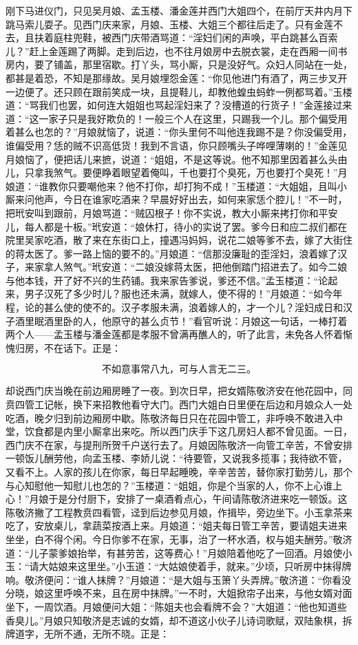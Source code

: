 刚下马进仪门，只见吴月娘、孟玉楼、潘金莲并西门大姐四个，在前厅天井内月下跳马索儿耍子。见西门庆来家，月娘、玉楼、大姐三个都往后走了。只有金莲不去，且扶着庭柱兜鞋，被西门庆带酒骂道：“淫妇们闲的声唤，平白跳甚么百索儿？”赶上金莲踢了两脚。走到后边，也不往月娘房中去脱衣裳，走在西厢一间书房内，要了铺盖，那里宿歇。打丫头，骂小厮，只是没好气。众妇人同站在一处，都甚是着恐，不知是那缘故。吴月娘埋怨金莲：“你见他进门有酒了，两三步叉开一边便了。还只顾在跟前笑成一块，且提鞋儿，却教他蝗虫蚂蚱一例都骂着。”玉楼道：“骂我们也罢，如何连大姐姐也骂起淫妇来了？没槽道的行货子！”金莲接过来道：“这一家子只是我好欺负的！一般三个人在这里，只踢我一个儿。那个偏受用着甚么也怎的？”月娘就恼了，说道：“你头里何不叫他连我踢不是？你没偏受用，谁偏受用？恁的贼不识高低货！我到不言语，你只顾嘴头子哗哩薄喇的！”金莲见月娘恼了，便把话儿来摭，说道：“姐姐，不是这等说。他不知那里因着甚么头由儿，只拿我煞气。要便睁着眼望着俺叫，千也要打个臭死，万也要打个臭死！”月娘道：“谁教你只要嘲他来？他不打你，却打狗不成！”玉楼道：“大姐姐，且叫小厮来问他声，今日在谁家吃酒来？早晨好好出去，如何来家恁个腔儿！”不一时，把玳安叫到跟前，月娘骂道：“贼囚根子！你不实说，教大小厮来拷打你和平安儿，每人都是十板。”玳安道：“娘休打，待小的实说了罢。爹今日和应二叔们都在院里吴家吃酒，散了来在东街口上，撞遇冯妈妈，说花二娘等爹不去，嫁了大街住的蒋太医了。爹一路上恼的要不的。”月娘道：“信那没廉耻的歪淫妇，浪着嫁了汉子，来家拿人煞气。”玳安道：“二娘没嫁蒋太医，把他倒踏门招进去了。如今二娘与他本钱，开了好不兴的生药铺。我来家告爹说，爹还不信。”孟玉楼道：“论起来，男子汉死了多少时儿？服也还未满，就嫁人，使不得的！”月娘道：“如今年程，论的甚么使的使不的。汉子孝服未满，浪着嫁人的，才一个儿？淫妇成日和汉子酒里眠酒里卧的人，他原守的甚么贞节！”看官听说：月娘这一句话，一棒打着两个人——孟玉楼与潘金莲都是孝服不曾满再醮人的，听了此言，未免各人怀着惭愧归房，不在话下。正是：

\[
不如意事常八九，可与人言无二三。
\]

却说西门庆当晚在前边厢房睡了一夜。到次日早，把女婿陈敬济安在他花园中，同贲四管工记帐，换下来招教他看守大门。西门大姐白日里便在后边和月娘众人一处吃酒，晚夕归到前边厢房中歇。陈敬济每日只在花园中管工，非呼唤不敢进入中堂，饮食都是内里小厮拿出来吃。所以西门庆手下这几房妇人都不曾见面。一日，西门庆不在家，与提刑所贺千户送行去了。月娘因陈敬济一向管工辛苦，不曾安排一顿饭儿酬劳他，向孟玉楼、李娇儿说：“待要管，又说我多揽事；我待欲不管，又看不上。人家的孩儿在你家，每日早起睡晚，辛辛苦苦，替你家打勤劳儿，那个与心知慰他一知慰儿也怎的？”玉楼道：“姐姐，你是个当家的人，你不上心谁上心！”月娘于是分付厨下，安排了一桌酒肴点心，午间请陈敬济进来吃一顿饭。这陈敬济撇了工程教贲四看管，迳到后边参见月娘，作揖毕，旁边坐下。小玉拿茶来吃了，安放桌儿，拿蔬菜按酒上来。月娘道：“姐夫每日管工辛苦，要请姐夫进来坐坐，白不得个闲。今日你爹不在家，无事，治了一杯水酒，权与姐夫酬劳。”敬济道：“儿子蒙爹娘抬举，有甚劳苦，这等费心！”月娘陪着他吃了一回酒。月娘使小玉：“请大姑娘来这里坐。”小玉道：“大姑娘使着手，就来。”少顷，只听房中抹得牌响。敬济便问：“谁人抹牌？”月娘道：“是大姐与玉箫丫头弄牌。”敬济道：“你看没分晓，娘这里呼唤不来，且在房中抹牌。”一不时，大姐掀帘子出来，与他女婿对面坐下，一周饮酒。月娘便问大姐：“陈姐夫也会看牌不会？”大姐道：“他也知道些香臭儿。”月娘只知敬济是志诚的女婿，却不道这小伙子儿诗词歌赋，双陆象棋，拆牌道字，无所不通，无所不晓。正是：

